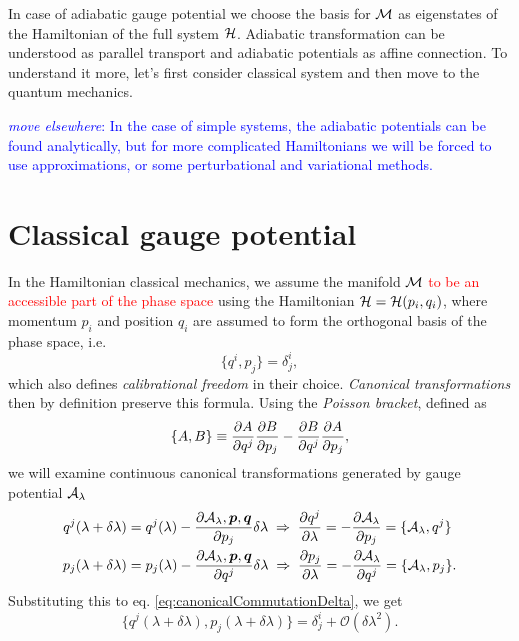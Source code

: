 In case of adiabatic gauge potential we choose the basis for $\mathcal{M}$ as eigenstates of the Hamiltonian of the full system $\mathcal{H}$. Adiabatic transformation can be understood as parallel transport and adiabatic potentials as affine connection. To understand it more, let's first consider classical system and then move to the quantum mechanics.


\textcolor{blue}{\emph{move elsewhere}: In the case of simple systems, the adiabatic potentials can be found analytically, but for more complicated Hamiltonians we will be forced to use approximations, or some perturbational and variational methods.}




\section{Classical gauge potential}
In the Hamiltonian classical mechanics, we assume the manifold $\mathcal{M}$ \textcolor{red}{to be an accessible part of the phase space} using the Hamiltonian $\mathcal{H}=\mathcal{H}(p_i,q_i)$, where momentum $p_i$ and position $q_i$ are assumed to form the orthogonal basis of the phase space, i.e.
\begin{equation}
    \{q^i,p_j\}=\delta^i_j,
    \label{eq:canonicalCommutationDelta}
\end{equation}
which also defines \emph{calibrational freedom} in their choice. \emph{Canonical transformations} then by definition preserve this formula. Using the \emph{Poisson bracket}, defined as
\begin{equation}
    \{A,B\}\equiv \frac{\partial A}{\partial q^j}\frac{\partial B}{\partial p_j}-\frac{\partial B}{\partial q^j}\frac{\partial A}{\partial p_j},
\end{equation}
we will examine continuous canonical transformations generated by gauge potential $\mathcal{A}_\lambda$
\begin{align}
        q^j(\lambda+\delta\lambda)&=q^j(\lambda)-\frac{\partial \mathcal{A}_\lambda,\bm{p},\bm{q}}{\partial p_j}\delta\lambda \;\Rightarrow\; \frac{\partial q^j}{\partial \lambda}=-\frac{\partial \mathcal{A}_\lambda}{\partial p_j}=\{\mathcal{A}_\lambda,q^j\}
        \label{eq:gaugeAsGeneratorOfMotion1}\\
        p_j(\lambda+\delta\lambda)&=p_j(\lambda)-\frac{\partial \mathcal{A}_\lambda,\bm{p},\bm{q}}{\partial q^j}\delta\lambda \;\Rightarrow\; \frac{\partial p_j}{\partial \lambda}=-\frac{\partial \mathcal{A}_\lambda}{\partial q^j}=\{\mathcal{A}_\lambda,p_j\}.
        \label{eq:gaugeAsGeneratorOfMotion2}
\end{align}
Substituting this to eq. \ref{eq:canonicalCommutationDelta}, we get
\begin{equation}
    \{q^j(\lambda+\delta\lambda),p_j(\lambda+\delta\lambda)\}=\delta^i_j + \mathcal{O}(\delta\lambda^2).
\end{equation}
 
